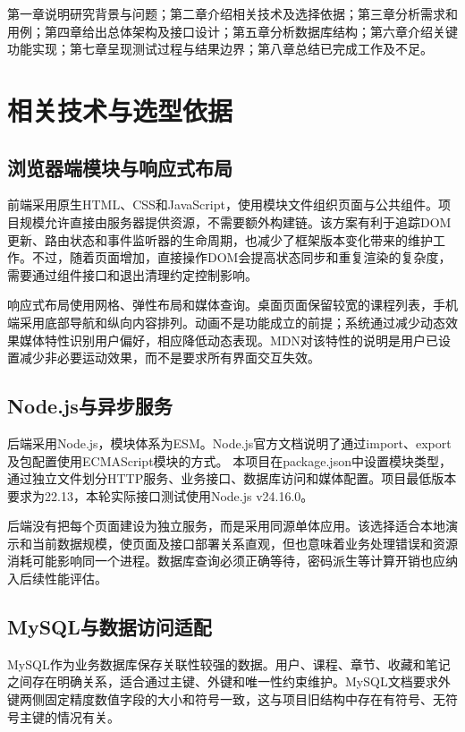 \documentclass[UTF8,12pt,a4paper,oneside,openany]{ctexbook}
\begin{document}
第一章说明研究背景与问题；第二章介绍相关技术及选择依据；第三章分析需求和用例；第四章给出总体架构及接口设计；第五章分析数据库结构；第六章介绍关键功能实现；第七章呈现测试过程与结果边界；第八章总结已完成工作及不足。


\chapter{相关技术与选型依据}

\section{浏览器端模块与响应式布局}

前端采用原生HTML、CSS和JavaScript，使用模块文件组织页面与公共组件。项目规模允许直接由服务器提供资源，不需要额外构建链。该方案有利于追踪DOM更新、路由状态和事件监听器的生命周期，也减少了框架版本变化带来的维护工作。不过，随着页面增加，直接操作DOM会提高状态同步和重复渲染的复杂度，需要通过组件接口和退出清理约定控制影响。


响应式布局使用网格、弹性布局和媒体查询。桌面页面保留较宽的课程列表，手机端采用底部导航和纵向内容排列。动画不是功能成立的前提；系统通过减少动态效果媒体特性识别用户偏好，相应降低动态表现。MDN对该特性的说明是用户已设置减少非必要运动效果，而不是要求所有界面交互失效。\cite{ref4}


\section{Node.js与异步服务}

后端采用Node.js，模块体系为ESM。Node.js官方文档说明了通过import、export及包配置使用ECMAScript模块的方式。\cite{ref5} 本项目在package.json中设置模块类型，通过独立文件划分HTTP服务、业务接口、数据库访问和媒体配置。项目最低版本要求为22.13，本轮实际接口测试使用Node.js v24.16.0。


后端没有把每个页面建设为独立服务，而是采用同源单体应用。该选择适合本地演示和当前数据规模，使页面及接口部署关系直观，但也意味着业务处理错误和资源消耗可能影响同一个进程。数据库查询必须正确等待，密码派生等计算开销也应纳入后续性能评估。


\section{MySQL与数据访问适配}

MySQL作为业务数据库保存关联性较强的数据。用户、课程、章节、收藏和笔记之间存在明确关系，适合通过主键、外键和唯一性约束维护。MySQL文档要求外键两侧固定精度数值字段的大小和符号一致，这与项目旧结构中存在有符号、无符号主键的情况有关。\cite{ref6}
\end{document}
